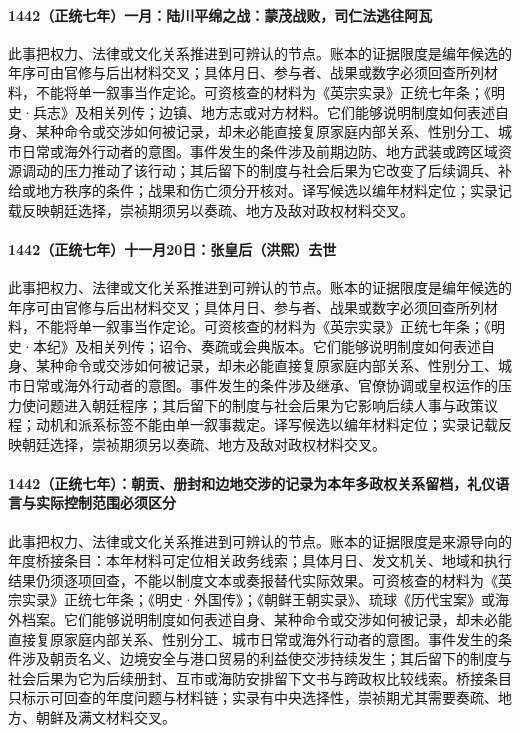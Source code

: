 \paragraph{1442（正统七年）一月：陆川平绵之战：蒙茂战败，司仁法逃往阿瓦} 此事把权力、法律或文化关系推进到可辨认的节点。账本的证据限度是编年候选的年序可由官修与后出材料交叉；具体月日、参与者、战果或数字必须回查所列材料，不能将单一叙事当作定论。可资核查的材料为《英宗实录》正统七年条；《明史·兵志》及相关列传；边镇、地方志或对方材料。它们能够说明制度如何表述自身、某种命令或交涉如何被记录，却未必能直接复原家庭内部关系、性别分工、城市日常或海外行动者的意图。事件发生的条件涉及前期边防、地方武装或跨区域资源调动的压力推动了该行动；其后留下的制度与社会后果为它改变了后续调兵、补给或地方秩序的条件；战果和伤亡须分开核对。译写候选以编年材料定位；实录记载反映朝廷选择，崇祯期须另以奏疏、地方及敌对政权材料交叉。

\paragraph{1442（正统七年）十一月20日：张皇后（洪熙）去世} 此事把权力、法律或文化关系推进到可辨认的节点。账本的证据限度是编年候选的年序可由官修与后出材料交叉；具体月日、参与者、战果或数字必须回查所列材料，不能将单一叙事当作定论。可资核查的材料为《英宗实录》正统七年条；《明史·本纪》及相关列传；诏令、奏疏或会典版本。它们能够说明制度如何表述自身、某种命令或交涉如何被记录，却未必能直接复原家庭内部关系、性别分工、城市日常或海外行动者的意图。事件发生的条件涉及继承、官僚协调或皇权运作的压力使问题进入朝廷程序；其后留下的制度与社会后果为它影响后续人事与政策议程；动机和派系标签不能由单一叙事裁定。译写候选以编年材料定位；实录记载反映朝廷选择，崇祯期须另以奏疏、地方及敌对政权材料交叉。

\paragraph{1442（正统七年）：朝贡、册封和边地交涉的记录为本年多政权关系留档，礼仪语言与实际控制范围必须区分} 此事把权力、法律或文化关系推进到可辨认的节点。账本的证据限度是来源导向的年度桥接条目：本年材料可定位相关政务线索；具体月日、发文机关、地域和执行结果仍须逐项回查，不能以制度文本或奏报替代实际效果。可资核查的材料为《英宗实录》正统七年条；《明史·外国传》；《朝鲜王朝实录》、琉球《历代宝案》或海外档案。它们能够说明制度如何表述自身、某种命令或交涉如何被记录，却未必能直接复原家庭内部关系、性别分工、城市日常或海外行动者的意图。事件发生的条件涉及朝贡名义、边境安全与港口贸易的利益使交涉持续发生；其后留下的制度与社会后果为它为后续册封、互市或海防安排留下文书与跨政权比较线索。桥接条目只标示可回查的年度问题与材料链；实录有中央选择性，崇祯期尤其需要奏疏、地方、朝鲜及满文材料交叉。


